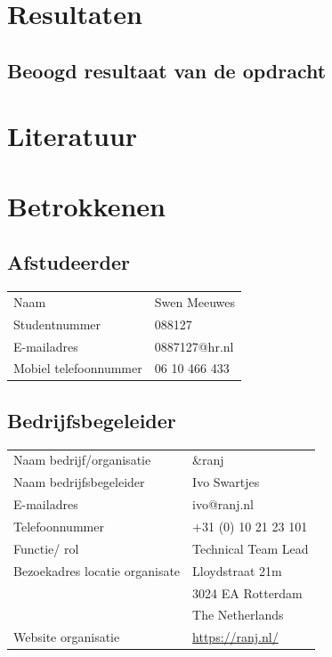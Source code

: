 \documentclass{report}
\makeatletter
\newcommand{\name}{Swen Meeuwes}
\newcommand{\studentnumber}{088127}
\newcommand{\email}{0887127@hr.nl}
\newcommand{\mobilephone}{06 10 466 433}
\newcommand{\organisation}{\&ranj }
\makeatother
\begin{document}
\chapter{Resultaten}

\section{Beoogd resultaat van de opdracht}


\chapter{Literatuur}






\chapter{Betrokkenen}

\section*{Afstudeerder}
\begin{table}[h]
\begin{tabular}{ll}
Naam & \name \\
Studentnummer & \studentnumber \\
E-mailadres & \email \\
Mobiel telefoonnummer & \mobilephone
\end{tabular}
\end{table}

\section*{Bedrijfsbegeleider}
\begin{table}[h]
\begin{tabular}{ll}
Naam bedrijf/organisatie & \organisation \\
Naam bedrijfsbegeleider & Ivo Swartjes \\
E-mailadres & ivo@ranj.nl \\
Telefoonnummer & +31 (0) 10 21 23 101 \\
Functie/ rol & Technical Team Lead \\
Bezoekadres locatie organisate & Lloydstraat 21m \\ 
 & 3024 EA Rotterdam \\
 & The Netherlands \\
Website organisatie & \url{https://ranj.nl/}
\end{tabular}
\end{table}
\end{document}
